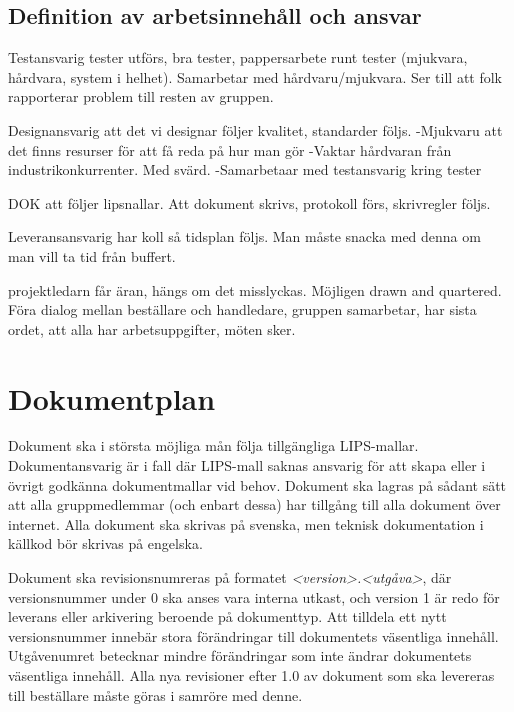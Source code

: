 \documentclass[a4paper,11pt]{article}
\begin{document}
    \subsection{Definition av arbetsinnehåll och ansvar}
    
    Testansvarig tester utförs, bra tester, pappersarbete runt tester (mjukvara, hårdvara, system i helhet). Samarbetar med hårdvaru/mjukvara. Ser till att folk rapporterar problem till resten av gruppen.
    
    Designansvarig att det vi designar följer kvalitet, standarder följs.
    -Mjukvaru att det finns resurser för att få reda på hur man gör
    -Vaktar hårdvaran från industrikonkurrenter. Med svärd.
    -Samarbetaar med testansvarig kring tester
    
    DOK att följer lipsnallar. Att dokument skrivs, protokoll förs, skrivregler följs.
    
    Leveransansvarig har koll så tidsplan följs. Man måste snacka med denna om man vill ta tid från buffert.
    
    projektledarn får äran, hängs om det misslyckas. Möjligen drawn and quartered. Föra dialog mellan beställare och handledare, gruppen samarbetar, har sista ordet, att alla har arbetsuppgifter, möten sker.
    
    \section{Dokumentplan}
    \label{sec:doc_plan}
    Dokument ska i största möjliga mån följa tillgängliga LIPS-mallar. Dokumentansvarig är i fall där LIPS-mall saknas ansvarig för att skapa eller i övrigt godkänna dokumentmallar vid behov. Dokument ska lagras på sådant sätt att alla gruppmedlemmar (och enbart dessa) har tillgång till alla dokument över internet. Alla dokument ska skrivas på svenska, men teknisk dokumentation i källkod bör skrivas på engelska. 
    
    Dokument ska revisionsnumreras på formatet \textit{\textless version\textgreater .\textless utgåva\textgreater}, där versionsnummer under 0 ska anses vara interna utkast, och version 1 är redo för leverans eller arkivering beroende på dokumenttyp. Att tilldela ett nytt versionsnummer innebär stora förändringar till dokumentets väsentliga innehåll. Utgåvenumret betecknar mindre förändringar som inte ändrar dokumentets väsentliga innehåll. Alla nya revisioner efter 1.0 av dokument som ska levereras till beställare måste göras i samröre med denne.
    
\end{document}
